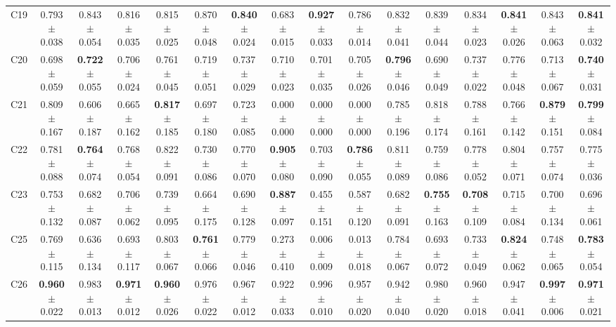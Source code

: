 \documentclass[11pt]{article}
\begin{document}
\begin{table}
{\begin{tabular}{lccccccccccccccc}
C19 & 0.793 $\pm$ 0.038 & 0.843 $\pm$ 0.054 & 0.816 $\pm$ 0.035 & 0.815 $\pm$ 0.025 & 0.870 $\pm$ 0.048 & \textbf{0.840} $\pm$ 0.024 & 0.683 $\pm$ 0.015 & \textbf{0.927} $\pm$ 0.033 & 0.786 $\pm$ 0.014 & 0.832 $\pm$ 0.041 & 0.839 $\pm$ 0.044 & 0.834 $\pm$ 0.023 & \textbf{0.841} $\pm$ 0.026 & 0.843 $\pm$ 0.063 & \textbf{0.841} $\pm$ 0.032 \\
C20 & 0.698 $\pm$ 0.059 & \textbf{0.722} $\pm$ 0.055 & 0.706 $\pm$ 0.024 & 0.761 $\pm$ 0.045 & 0.719 $\pm$ 0.051 & 0.737 $\pm$ 0.029 & 0.710 $\pm$ 0.023 & 0.701 $\pm$ 0.035 & 0.705 $\pm$ 0.026 & \textbf{0.796} $\pm$ 0.046 & 0.690 $\pm$ 0.049 & 0.737 $\pm$ 0.022 & 0.776 $\pm$ 0.048 & 0.713 $\pm$ 0.067 & \textbf{0.740} $\pm$ 0.031 \\
C21 & 0.809 $\pm$ 0.167 & 0.606 $\pm$ 0.187 & 0.665 $\pm$ 0.162 & \textbf{0.817} $\pm$ 0.185 & 0.697 $\pm$ 0.180 & 0.723 $\pm$ 0.085 & 0.000 $\pm$ 0.000 & 0.000 $\pm$ 0.000 & 0.000 $\pm$ 0.000 & 0.785 $\pm$ 0.196 & 0.818 $\pm$ 0.174 & 0.788 $\pm$ 0.161 & 0.766 $\pm$ 0.142 & \textbf{0.879} $\pm$ 0.151 & \textbf{0.799} $\pm$ 0.084 \\
C22 & 0.781 $\pm$ 0.088 & \textbf{0.764} $\pm$ 0.074 & 0.768 $\pm$ 0.054 & 0.822 $\pm$ 0.091 & 0.730 $\pm$ 0.086 & 0.770 $\pm$ 0.070 & \textbf{0.905} $\pm$ 0.080 & 0.703 $\pm$ 0.090 & \textbf{0.786} $\pm$ 0.055 & 0.811 $\pm$ 0.089 & 0.759 $\pm$ 0.086 & 0.778 $\pm$ 0.052 & 0.804 $\pm$ 0.071 & 0.757 $\pm$ 0.074 & 0.775 $\pm$ 0.036 \\
C23 & 0.753 $\pm$ 0.132 & 0.682 $\pm$ 0.087 & 0.706 $\pm$ 0.062 & 0.739 $\pm$ 0.095 & 0.664 $\pm$ 0.175 & 0.690 $\pm$ 0.128 & \textbf{0.887} $\pm$ 0.097 & 0.455 $\pm$ 0.151 & 0.587 $\pm$ 0.120 & 0.682 $\pm$ 0.091 & \textbf{0.755} $\pm$ 0.163 & \textbf{0.708} $\pm$ 0.109 & 0.715 $\pm$ 0.084 & 0.700 $\pm$ 0.134 & 0.696 $\pm$ 0.061 \\
C25 & 0.769 $\pm$ 0.115 & 0.636 $\pm$ 0.134 & 0.693 $\pm$ 0.117 & 0.803 $\pm$ 0.067 & \textbf{0.761} $\pm$ 0.066 & 0.779 $\pm$ 0.046 & 0.273 $\pm$ 0.410 & 0.006 $\pm$ 0.009 & 0.013 $\pm$ 0.018 & 0.784 $\pm$ 0.067 & 0.693 $\pm$ 0.072 & 0.733 $\pm$ 0.049 & \textbf{0.824} $\pm$ 0.062 & 0.748 $\pm$ 0.065 & \textbf{0.783} $\pm$ 0.054 \\
C26 & \textbf{0.960} $\pm$ 0.022 & 0.983 $\pm$ 0.013 & \textbf{0.971} $\pm$ 0.012 & \textbf{0.960} $\pm$ 0.026 & 0.976 $\pm$ 0.022 & 0.967 $\pm$ 0.012 & 0.922 $\pm$ 0.033 & 0.996 $\pm$ 0.010 & 0.957 $\pm$ 0.020 & 0.942 $\pm$ 0.040 & 0.980 $\pm$ 0.020 & 0.960 $\pm$ 0.018 & 0.947 $\pm$ 0.041 & \textbf{0.997} $\pm$ 0.006 & \textbf{0.971} $\pm$ 0.021 \\

\end{tabular}}
\end{table}
\end{document}
